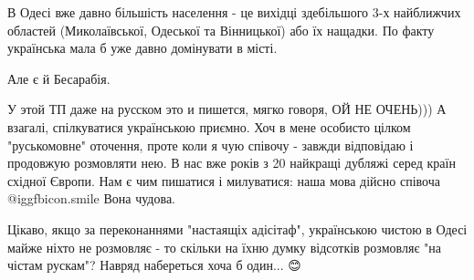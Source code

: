  

В Одесі вже давно більшість населення - це вихідці здебільшого 3-х найближчих
областей (Миколаївської, Одеської та Вінницької) або їх нащадки. По факту
українська мала б уже давно домінувати в місті.

\begin{itemize} %
 
Але є й Бесарабія.
\end{itemize} %

 

\obeycr
У этой ТП даже на русском это и пишется, мягко говоря, ОЙ НЕ ОЧЕНЬ)))
А взагалі, спілкуватися українською приємно. Хоч в мене особисто цілком "руськомовне" оточення, проте коли я чую співочу - завжди відповідаю і продовжую розмовляти нею.
В нас вже років з 20 найкращі дубляжі серед країн східної Європи.
Нам є чим пишатися і милуватися:
наша мова дійсно співоча  @igg{fbicon.smile} 
Вона чудова.
\restorecr

 

Цікаво, якщо за переконаннями "настаящіх адісітаф", українською чистою в Одесі
майже ніхто не розмовляє - то скільки на їхню думку відсотків розмовляє "на
чістам рускам"? Навряд набереться хоча б один... 😊

